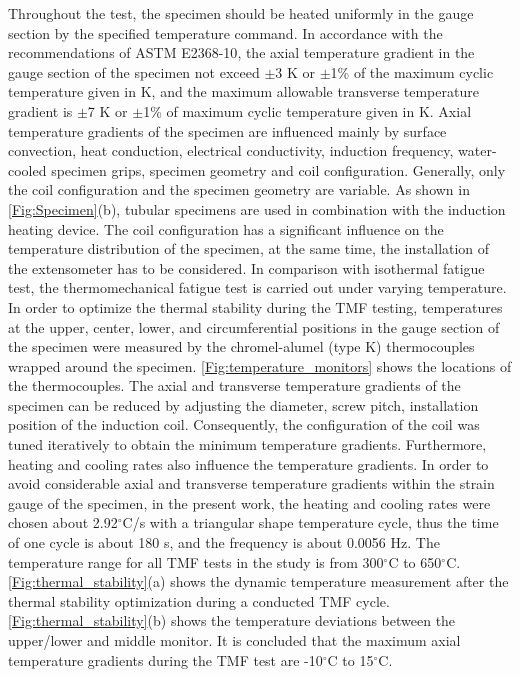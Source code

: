 Throughout the test, the specimen should be heated uniformly in the gauge section by the specified temperature command. In accordance with the recommendations of ASTM E2368-10\cite{ASTME2005}, the axial temperature gradient in the gauge section of the specimen not exceed $\pm$3 K or $\pm$1\% of the
maximum cyclic temperature given in K, and the maximum allowable transverse temperature gradient is $\pm$7 K or $\pm$1\% of maximum cyclic temperature given in K.
Axial temperature gradients of the specimen are influenced mainly by surface convection, heat conduction, electrical conductivity, induction frequency, water-cooled specimen grips, specimen geometry and coil configuration. Generally, only the coil configuration and the specimen geometry are variable. As shown in \ref{Fig:Specimen}(b), tubular specimens are used in combination with the induction heating device. The coil configuration has a significant influence on the temperature distribution of the specimen, at the same time, the installation of the extensometer has to be considered\cite{Hahner2006}.
In comparison with isothermal fatigue test, the thermomechanical fatigue test is carried out under varying temperature.
In order to optimize the thermal stability during the TMF testing, temperatures at the upper, center, lower, and circumferential positions in the gauge section of the specimen were measured by the chromel-alumel (type K) thermocouples wrapped around the specimen. \ref{Fig:temperature_monitors} shows the locations of the thermocouples.
The axial and transverse temperature gradients of the specimen can be reduced by adjusting the diameter, screw pitch, installation position of the induction coil.
Consequently, the configuration of the coil was tuned iteratively to obtain the minimum temperature gradients.
Furthermore, heating and cooling rates also influence the temperature gradients.
In order to avoid considerable axial and transverse temperature gradients within the strain gauge of the specimen, in the present work, the heating and cooling rates were chosen about 2.92$^\circ$C/s with a triangular shape temperature cycle, thus the time of one cycle is about 180 s, and the frequency is about 0.0056 Hz.
The temperature range for all TMF tests in the study is from 300$^\circ$C to 650$^\circ$C. \ref{Fig:thermal_stability}(a) shows the dynamic temperature measurement after the thermal stability optimization during a conducted TMF cycle. \ref{Fig:thermal_stability}(b) shows the temperature
deviations between the upper/lower and middle monitor. It is concluded that the maximum axial temperature gradients during the TMF test are -10$^\circ$C to 15$^\circ$C.

